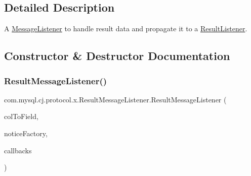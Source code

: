 \subsection{Detailed Description}
A \mbox{\hyperlink{interfacecom_1_1mysql_1_1cj_1_1protocol_1_1_message_listener}{Message\+Listener}} to handle result data and propagate it to a \mbox{\hyperlink{interfacecom_1_1mysql_1_1cj_1_1protocol_1_1_result_listener}{Result\+Listener}}. 

\subsection{Constructor \& Destructor Documentation}
\mbox{\label{classcom_1_1mysql_1_1cj_1_1protocol_1_1x_1_1_result_message_listener_a11f2adec18c2182473f77f004b237984}} 
\subsubsection{\texorpdfstring{Result\+Message\+Listener()}{ResultMessageListener()}}
{\footnotesize\ttfamily com.\+mysql.\+cj.\+protocol.\+x.\+Result\+Message\+Listener.\+Result\+Message\+Listener (\begin{DoxyParamCaption}\item[{\mbox{\hyperlink{interfacecom_1_1mysql_1_1cj_1_1protocol_1_1_protocol_entity_factory}{Protocol\+Entity\+Factory}}$<$ \mbox{\hyperlink{classcom_1_1mysql_1_1cj_1_1result_1_1_field}{Field}}, \mbox{\hyperlink{classcom_1_1mysql_1_1cj_1_1protocol_1_1x_1_1_x_message}{X\+Message}} $>$}]{col\+To\+Field,  }\item[{\mbox{\hyperlink{interfacecom_1_1mysql_1_1cj_1_1protocol_1_1_protocol_entity_factory}{Protocol\+Entity\+Factory}}$<$ \mbox{\hyperlink{classcom_1_1mysql_1_1cj_1_1protocol_1_1x_1_1_notice}{Notice}}, \mbox{\hyperlink{classcom_1_1mysql_1_1cj_1_1protocol_1_1x_1_1_x_message}{X\+Message}} $>$}]{notice\+Factory,  }\item[{\mbox{\hyperlink{interfacecom_1_1mysql_1_1cj_1_1protocol_1_1_result_listener}{Result\+Listener}}$<$ \mbox{\hyperlink{classcom_1_1mysql_1_1cj_1_1protocol_1_1x_1_1_statement_execute_ok}{Statement\+Execute\+Ok}} $>$}]{callbacks }\end{DoxyParamCaption})}



